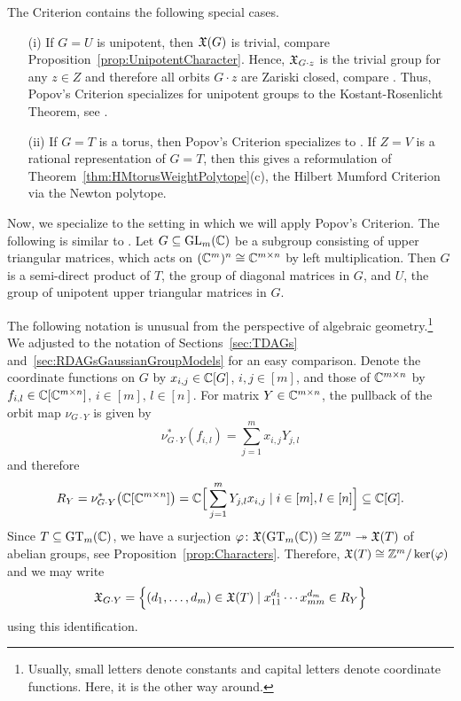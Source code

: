 \begin{remark}\label{rem:PopovCriterion}
	The Criterion contains the following special cases.
	\begin{itemize}
		\item[(i)] If $G = U$ is unipotent, then $\mathfrak{X}(G)$ is trivial, compare Proposition~\ref{prop:UnipotentCharacter}. Hence, $\mathfrak{X}_{G \cdot z}$ is the trivial group for any $z \in Z$ and therefore all orbits $G \cdot z$ are Zariski closed, compare \cite[Corollary~3]{popov1989closed}. Thus, Popov's Criterion specializes for unipotent groups to the Kostant-Rosenlicht Theorem, see \cite[Theorem~2]{rosenlicht1961onQuotient}.
		
		\item[(ii)] If $G = T$ is a torus, then Popov's Criterion specializes to \cite[Corollary~4]{popov1989closed}. If $Z=V$ is a rational representation of $G = T$, then this gives a reformulation of Theorem~\ref{thm:HMtorusWeightPolytope}(c),
		the Hilbert Mumford Criterion via the Newton polytope.
		\hfill\remSymbol
	\end{itemize}
\end{remark}

Now, we specialize to the setting in which we will apply Popov's Criterion. The following is similar to \cite[Section~9]{popov1989closed}. Let $G \subseteq \operatorname{GL}_m(\mathbb C)$ be a subgroup consisting of upper triangular matrices, which acts on $(\mathbb C^{m})^n \cong \mathbb C^{m \times n}$ by left multiplication. Then $G$ is a semi-direct product of $T$, the group of diagonal matrices in $G$, and $U$, the group of unipotent upper triangular matrices in $G$.

The following notation is unusual from the perspective of algebraic geometry.\footnote{Usually, small letters denote constants and capital letters denote coordinate functions. Here, it is the other way around.} We adjusted to the notation of Sections~\ref{sec:TDAGs} and~\ref{sec:RDAGsGaussianGroupModels} for an easy comparison.
Denote the coordinate functions on $G$ by $x_{i,j} \in \mathbb C[G]$,  $i,j \in [m]$, and those of $\mathbb C^{m \times n}$ by $f_{i,l} \in \mathbb C[\mathbb C^{m \times n}]$, $i \in [m], \, l \in [n]$. For matrix $Y \in \mathbb C^{m \times n}$, the pullback of the orbit map $\nu_{G \cdot Y}$ is given by
\[ \nu_{G \cdot Y}^*(f_{i,l}) = \sum_{j=1}^m x_{i,j} Y_{j,l} \]
and therefore
\begin{equation}\label{eq:PopovRY}
	R_Y = \nu_{G \cdot Y}^* \big( \mathbb C[\mathbb C^{m \times n}] \big) = \mathbb C \Big[ \sum_{j=1}^m Y_{j,l} x_{i,j} \mid i \in [m], l \in [n] \Big] \subseteq \mathbb C[G].
\end{equation} %
Since $T \subseteq \operatorname{GT}_m(\mathbb C)$, we have a surjection $\varphi \colon \mathfrak{X}(\operatorname{GT}_m(\mathbb C)) \cong \mathbb Z^m \twoheadrightarrow \mathfrak{X}(T)$ of abelian groups, see Proposition~\ref{prop:Characters}. Therefore, $\mathfrak{X}(T) \cong \mathbb Z^m / \ker(\varphi)$ and we may write
\begin{align*}
	\mathfrak{X}_{G \cdot Y} = \left\lbrace (d_1,\ldots,d_m) \in \mathfrak{X}(T) \mid x_{11}^{d_1} \cdots x_{mm}^{d_m} \in R_Y \right\rbrace 
\end{align*}
using this identification.

